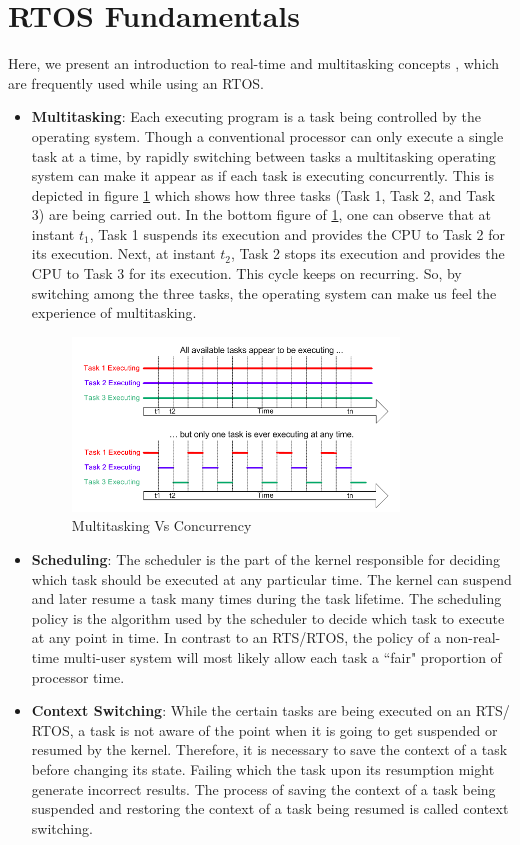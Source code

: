 \documentclass[12pt]{report}
\begin{document}
\section{RTOS Fundamentals}
 Here, we present an introduction to real-time and multitasking concepts \cite{rtos-funda}, which are frequently used while using an RTOS.
 \begin{itemize}
     \item \textbf{Multitasking}: Each executing program is a task being controlled by the operating system. Though a conventional processor can only execute a single task at a time, by rapidly switching between tasks a multitasking operating system can make it appear as if each task is executing concurrently. This is depicted in figure \ref{fig:multitasking} which shows how three tasks (Task 1, Task 2, and Task 3) are being carried out. In the bottom figure of \ref{fig:multitasking}, one can observe that at instant $t_1$, Task 1 suspends its execution and provides the CPU to Task 2 for its execution. Next, at instant $t_2$, Task 2 stops its execution and provides the CPU to Task 3 for its execution. This cycle keeps on recurring. So, by switching among the three tasks, the operating system can make us feel the experience of multitasking. 
     \begin{figure}[h]
    \centering
    \includegraphics[width=0.82\textwidth]{images/multitasking.png}
    \caption[Multitasking Vs Concurrency]{Multitasking Vs Concurrency \cite{rtos-funda}}
    \label{fig:multitasking}
    \end{figure}
     \item \textbf{Scheduling}: The scheduler is the part of the kernel responsible for deciding which task should be executed at any particular time. The kernel can suspend and later resume a task many times during the task lifetime. The scheduling policy is the algorithm used by the scheduler to decide which task to execute at any point in time. In contrast to an RTS/RTOS, the policy of a non-real-time multi-user system will most likely allow each task a ``fair" proportion of processor time. 
     \item \textbf{Context Switching}: While the certain tasks are being executed on an RTS/ RTOS, a task is not aware of the point when it is going to get suspended or resumed by the kernel. Therefore, it is necessary to save the context of a task before changing its state. Failing which the task upon its resumption might generate incorrect results. The process of saving the context of a task being suspended and restoring the context of a task being resumed is called context switching.
 \end{itemize}
\end{document}
